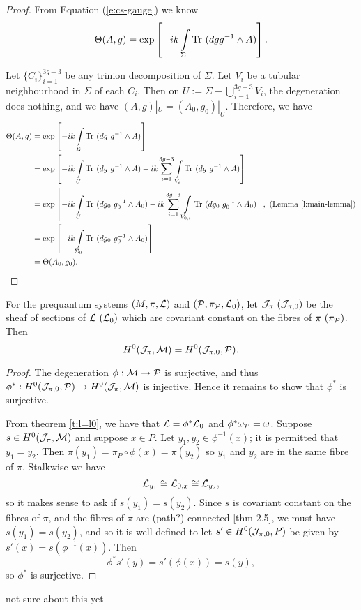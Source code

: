 	\begin{proof}
		From Equation (\ref{e:cs-gauge}) we know
		\begin{equation}
			\Theta(A,g) = \exp\left[-ik\int\limits_\Sigma \text{Tr }(dg g^{-1}\wedge A)\right].
		\end{equation}
		
		Let $\{C_i\}_{i=1}^{3g-3}$ be any trinion decomposition of $\Sigma$. Let $V_i$ be a tubular neighbourhood in $\Sigma$ of each $C_i$. Then on $U:= \Sigma - \bigcup_{i=1}^{3g-3}V_i$, the degeneration does nothing, and we have $(A,g)|_U = (A_0,g_0)|_U$. Therefore, we have
		\begin{align*}
				\Theta(A,g) &= \exp\left[-ik\int\limits_\Sigma \text{Tr }(dg~ g^{-1}\wedge A)\right]\\
				&= \exp\left[-ik\int\limits_U \text{Tr }(dg~g^{-1}\wedge A)
				-ik \sum_{i=1}^{3g-3}\int\limits_{V_i} \text{Tr }(dg~g^{-1}\wedge A)\right]\\
				&= \exp\left[-ik\int\limits_U \text{Tr }(dg_0~g_0^{-1}\wedge A_0)
				-ik \sum_{i=1}^{3g-3}\int\limits_{V_{0,i}} \text{Tr }(dg_0~g_0^{-1}\wedge A_0)\right],~ (\text{Lemma } \ref{l:main-lemma})\\
				&= \exp\left[-ik\int\limits_{\Sigma_0} \text{Tr }(dg_0~ g_0^{-1}\wedge A_0)\right]\\
				&= \Theta(A_0,g_0).
		\end{align*}
	\end{proof}
	\begin{theorem}
		For the prequantum systems $(M,\pi,\mathcal{L})$ and $(\mathcal{P},\pi_{\mathcal{P}}, \mathcal{L}_0)$, let $\mathcal{J}_\pi ~(\mathcal{J}_{\pi,0})$ be the sheaf of sections of $\mathcal{L} ~(\mathcal{L}_0)$ which are covariant constant on the fibres of $\pi ~(\pi_{\mathcal{P}})$. Then
		\begin{equation}
			H^0(\mathcal{J}_\pi, \mathcal{M}) = H^0(\mathcal{J}_{\pi,0}, \mathcal{P}).
		\end{equation}
	\end{theorem}
	\begin{proof}
		The degeneration $\phi:\mathcal{M}\to\mathcal{P}$ is surjective, and thus $\phi^\ast:H^0(\mathcal{J}_{\pi,0},\mathcal{P}) \to H^0(\mathcal{J}_\pi,\mathcal{M})$ is injective. Hence it remains to show that $\phi^\ast$ is surjective.
		\smallskip
		
		From theorem \ref{t:l=l0}, we have that $\mathcal{L}=\phi^\ast \mathcal{L}_0$ and $\phi^\ast \omega_{\mathcal{P}} = \omega$. Suppose $s\in H^0(\mathcal{J}_{\pi},\mathcal{M})$ and suppose $x \in P$. Let $y_1,y_2 \in \phi^{-1}(x)$; it is permitted that $y_1=y_2$. Then $\pi(y_1) = \pi_P\circ \phi(x) = \pi(y_2)$ so $y_1$ and $y_2$ are in the same fibre of $\pi$. Stalkwise we have
		\begin{equation}
			\mathcal{L}_{y_1} \cong \mathcal{L}_{0,x} \cong \mathcal{L}_{y_2},
		\end{equation} 
		so it makes sense to ask if $s(y_1) = s(y_2)$. Since $s$ is covariant constant on the fibres of $\pi$, and the fibres of $\pi$ are (path?) connected \cite{jeffrey_bohr-sommerfeld_1992}[thm 2.5], we must have $s(y_1)=s(y_2)$, and so it is well defined to let $s'\in H^0(\mathcal{J}_{\pi,0},P)$ be given by $s'(x) = s\left(\phi^{-1}(x)\right)$. Then
		\begin{equation}
			\phi^\ast s'(y) = s'(\phi(x)) = s(y),
		\end{equation}
		so $\phi^\ast$ is surjective.
		\end{proof}
		not sure about this yet
		
	